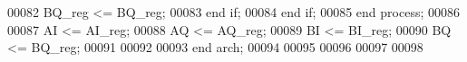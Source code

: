\begin{DoxyCode}
00082                     \textcolor{vhdlchar}{BQ_reg} \textcolor{vhdlchar}{<=} \textcolor{vhdlchar}{BQ_reg};
00083             \textcolor{keywordflow}{end} \textcolor{keywordflow}{if};
00084         \textcolor{keywordflow}{end} \textcolor{keywordflow}{if};
00085     \textcolor{keywordflow}{end} \textcolor{keywordflow}{process};
00086 
00087 \textcolor{vhdlchar}{AI} \textcolor{vhdlchar}{<=} \textcolor{vhdlchar}{AI_reg};
00088 \textcolor{vhdlchar}{AQ} \textcolor{vhdlchar}{<=} \textcolor{vhdlchar}{AQ_reg};
00089 \textcolor{vhdlchar}{BI} \textcolor{vhdlchar}{<=} \textcolor{vhdlchar}{BI_reg};
00090 \textcolor{vhdlchar}{BQ} \textcolor{vhdlchar}{<=} \textcolor{vhdlchar}{BQ_reg};
00091 
00092   
00093 \textcolor{keywordflow}{end} \textcolor{vhdlchar}{arch};   
00094 
00095 
00096 
00097 
00098 
\end{DoxyCode}
